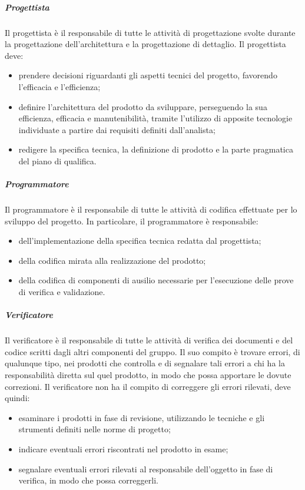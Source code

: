 		\subparagraph{Progettista}

			Il progettista è il responsabile di tutte le attività di progettazione svolte durante la progettazione dell'architettura e la progettazione di dettaglio.
			\newline
			Il progettista deve:

			\begin{itemize}
				\item prendere decisioni riguardanti gli aspetti tecnici del progetto, favorendo l'efficacia e l'efficienza;
				\item definire l'architettura del prodotto da sviluppare, perseguendo la sua efficienza, efficacia e manutenibilità, tramite l'utilizzo di apposite tecnologie individuate a partire dai requisiti definiti dall'analista;
				\item redigere la specifica tecnica, la definizione di prodotto e la parte pragmatica del piano di qualifica.
			\end{itemize}

		\subparagraph{Programmatore}

			Il programmatore è il responsabile di tutte le attività di codifica effettuate per lo sviluppo del progetto.
			\newline
			In particolare, il programmatore è responsabile:

			\begin{itemize}
				\item dell'implementazione della specifica tecnica redatta dal progettista;
				\item della codifica mirata alla realizzazione del prodotto;
				\item della codifica di componenti di ausilio necessarie per l'esecuzione delle prove di verifica e validazione.
			\end{itemize}

		\subparagraph{Verificatore}

			Il verificatore è il responsabile di tutte le attività di verifica dei documenti e del codice scritti dagli altri componenti del gruppo. Il suo compito è trovare errori, di qualunque tipo, nei prodotti che controlla e di segnalare tali errori a chi ha la responsabilità diretta sul quel prodotto, in modo che possa apportare le dovute correzioni.
			\newline
			Il verificatore non ha il compito di correggere gli errori rilevati, deve quindi:

			\begin{itemize}
				\item esaminare i prodotti in fase di revisione, utilizzando le tecniche e gli strumenti definiti nelle norme di progetto;
				\item indicare eventuali errori riscontrati nel prodotto in esame;
				\item segnalare eventuali errori rilevati al responsabile dell'oggetto in fase di verifica, in modo che possa correggerli.
			\end{itemize}

